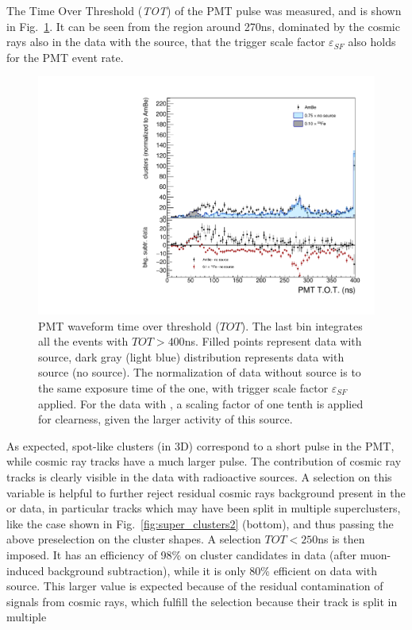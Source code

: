%
The Time Over Threshold (\textit{TOT}) of the PMT pulse was measured,
and is shown in Fig.~\ref{fig:pmttot}. It can be seen from the region
around 270\unit{ns}, dominated by the cosmic rays also in the data
with the \ambe source, that the trigger scale factor
$\varepsilon_{SF}$ also holds for the PMT event rate.
%
\begin{figure}[ht]
  \begin{center}
  \includegraphics[width=0.45\linewidth]{figures/pmt_tot}

   \caption{PMT waveform time over threshold ($TOT$).  The last bin
    integrates all the events with $TOT>400$\unit{ns}. Filled points
    represent data with \ambe source, dark gray (light blue)
    distribution represents data with \fe source (no source).  The
    normalization of data without source is to the same exposure time
    of the \ambe one, with trigger scale factor $\varepsilon_{SF}$
    applied. For the data with \fe, a scaling factor of one tenth is
    applied for clearness, given the larger activity of this
    source. \label{fig:pmttot}}

  \end{center}
\end{figure}
%
As expected, spot-like clusters (in 3D) correspond to a short pulse in
the PMT, while cosmic ray tracks have a much larger pulse. The
contribution of cosmic ray tracks is clearly visible in the data with
radioactive sources. A selection on this variable is helpful to
further reject residual cosmic rays background present in the \ambe or
\fe data, in particular tracks which may have been split in multiple
superclusters, like the case shown in Fig.~\ref{fig:super_clusters2}
(bottom), and thus passing the above preselection on the cluster
shapes. A selection $TOT<250$\unit{ns} is then imposed.  It has an
efficiency of 98\% on cluster candidates in
\ambe data (after muon-induced background subtraction), while it is only 80\%
efficient on data with \fe source. This larger value is expected
because of the residual contamination of signals from cosmic rays,
which fulfill the selection because their track is split in multiple
